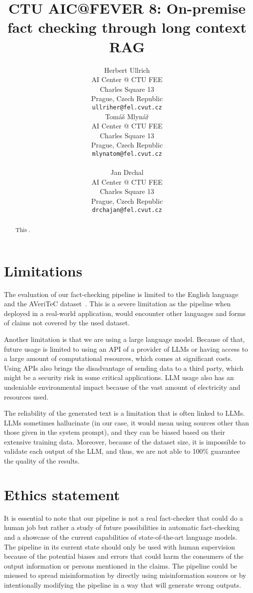 \documentclass[11pt]{article}
\title{CTU AIC@FEVER 8: On-premise fact checking through long context RAG}
\author{Herbert Ullrich \\
AI Center @ CTU FEE\\
Charles Square 13\\
Prague, Czech Republic\\
\texttt{ullriher@fel.cvut.cz} \\\And
Tomáš Mlynář \\
AI Center @ CTU FEE\\
Charles Square 13\\
Prague, Czech Republic\\
\texttt{mlynatom@fel.cvut.cz} \\ \\\And
Jan Drchal \\
AI Center @ CTU FEE\\
Charles Square 13\\
Prague, Czech Republic\\
\texttt{drchajan@fel.cvut.cz} \\}
\newcommand{\averitec}{AVeriTeC}
\begin{document}
\maketitle
\begin{abstract}
This .

\end{abstract}



%

%


\section*{Limitations}
The evaluation of our fact-checking pipeline is limited to the English language and the \averitec{} dataset~\cite{averitec2024}. This is a severe limitation as the pipeline when deployed in a real-world application, would encounter other languages and forms of claims not covered by the used dataset.

Another limitation is that we are using a large language model. Because of that, future usage is limited to using an API of a provider of LLMs or having access to a large amount of computational resources, which comes at significant costs. Using APIs also brings the disadvantage of sending data to a third party, which might be a security risk in some critical applications. LLM usage also has an undeniable environmental impact because of the vast amount of electricity and resources used.

The reliability of the generated text is a limitation that is often linked to LLMs. LLMs sometimes hallucinate (in our case, it would mean using sources other than those given in the system prompt), and they can be biased based on their extensive training data. Moreover, because of the dataset size, it is impossible to validate each output of the LLM, and thus, we are not able to 100\% guarantee the quality of the results.

\section*{Ethics statement}
It is essential to note that our pipeline is not a real fact-checker that could do a human job but rather a study of future possibilities in automatic fact-checking and a showcase of the current capabilities of state-of-the-art language models. The pipeline in its current state should only be used with human supervision because of the potential biases and errors that could harm the consumers of the output information or persons mentioned in the claims. The pipeline could be misused to spread misinformation by directly using misinformation sources or by intentionally modifying the pipeline in a way that will generate wrong outputs.
\end{document}
